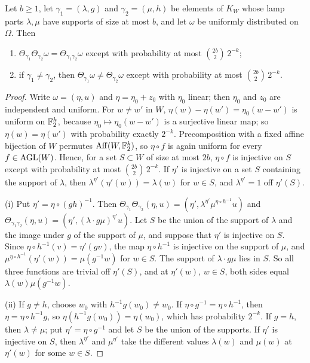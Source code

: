 \begin{lemma}\label{lem:hash}
Let $b\ge1$, let $\gamma_1=(\lambda,g)$ and $\gamma_2=(\mu,h)$ be elements of $K_W$ whose lamp parts $\lambda,\mu$ have supports of size at most
$b$, and let $\omega$ be uniformly distributed on $\Omega$. Then
\begin{enumerate}[label=(\roman*),itemsep=1pt]
\item $\Theta_{\gamma_1}\Theta_{\gamma_2}\omega=\Theta_{\gamma_1\gamma_2}\omega$ except with probability at most $\binom{2b}2\,2^{-k}$;
\item if $\gamma_1\ne\gamma_2$, then $\Theta_{\gamma_1}\omega\ne\Theta_{\gamma_2}\omega$ except with probability at most $\binom{2b}2\,2^{-k}$.
\end{enumerate}
\end{lemma}

\begin{proof}
Write $\omega=(\eta,u)$ and $\eta=\eta_0+z_0$ with $\eta_0$ linear; then $\eta_0$ and $z_0$ are independent and uniform. For $w\ne w'$ in $W$,
$\eta(w)-\eta(w')=\eta_0(w-w')$ is uniform on $\mathbb F_2^k$, because $\eta_0\mapsto\eta_0(w-w')$ is a surjective linear map; so
$\eta(w)=\eta(w')$ with probability exactly $2^{-k}$. Precomposition with a fixed affine bijection of $W$ permutes $\operatorname{Aff}(W,\mathbb F_2^k)$, so
$\eta\circ f$ is again uniform for every $f\in\operatorname{AGL}(W)$. Hence, for a set $S\subset W$ of size at most $2b$, $\eta\circ f$ is injective on $S$ except
with probability at most $\binom{2b}2\,2^{-k}$. If $\eta'$ is injective on a set $S$ containing the support of $\lambda$, then
$\lambda^{\eta'}(\eta'(w))=\lambda(w)$ for $w\in S$, and $\lambda^{\eta'}=1$ off $\eta'(S)$.

(i) Put $\eta'=\eta\circ(gh)^{-1}$. Then $\Theta_{\gamma_1}\Theta_{\gamma_2}(\eta,u)=(\eta',\lambda^{\eta'}\mu^{\eta\circ h^{-1}}u)$ and
$\Theta_{\gamma_1\gamma_2}(\eta,u)=(\eta',(\lambda\cdot g\mu)^{\eta'}u)$. Let $S$ be the union of the support of $\lambda$ and the image under $g$ of
the support of $\mu$, and suppose that $\eta'$ is injective on $S$. Since $\eta\circ h^{-1}(v)=\eta'(gv)$, the map $\eta\circ h^{-1}$ is injective on
the support of $\mu$, and $\mu^{\eta\circ h^{-1}}(\eta'(w))=\mu(g^{-1}w)$ for $w\in S$. The support of $\lambda\cdot g\mu$ lies in $S$. So all three
functions are trivial off $\eta'(S)$, and at $\eta'(w)$, $w\in S$, both sides equal $\lambda(w)\mu(g^{-1}w)$.

(ii) If $g\ne h$, choose $w_0$ with $h^{-1}g(w_0)\ne w_0$. If $\eta\circ g^{-1}=\eta\circ h^{-1}$, then $\eta=\eta\circ h^{-1}g$, so
$\eta(h^{-1}g(w_0))=\eta(w_0)$, which has probability $2^{-k}$. If $g=h$, then $\lambda\ne\mu$; put $\eta'=\eta\circ g^{-1}$ and let $S$ be the union
of the supports. If $\eta'$ is injective on $S$, then $\lambda^{\eta'}$ and $\mu^{\eta'}$ take the different values $\lambda(w)$ and $\mu(w)$ at
$\eta'(w)$ for some $w\in S$.
\end{proof}

